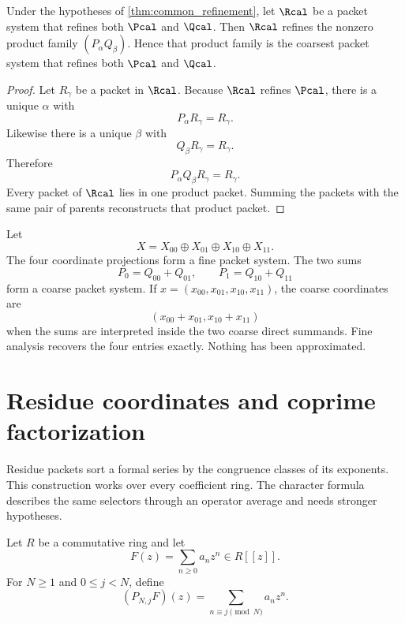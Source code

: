 \begin{proposition}\label{prop:coarsest_common_refinement}
Under the hypotheses of \cref{thm:common_refinement}, let $\Rcal$ be a packet system that refines both $\Pcal$ and $\Qcal$.  Then $\Rcal$ refines the nonzero product family $(P_\alpha Q_\beta)$.  Hence that product family is the coarsest packet system that refines both $\Pcal$ and $\Qcal$.
\end{proposition}

\begin{proof}
Let $R_\gamma$ be a packet in $\Rcal$.  Because $\Rcal$ refines $\Pcal$, there is a unique $\alpha$ with
\[
P_\alpha R_\gamma=R_\gamma.
\]
Likewise there is a unique $\beta$ with
\[
Q_\beta R_\gamma=R_\gamma.
\]
Therefore
\[
P_\alpha Q_\beta R_\gamma=R_\gamma.
\]
Every packet of $\Rcal$ lies in one product packet.  Summing the packets with the same pair of parents reconstructs that product packet.
\end{proof}

\begin{example}\label{ex:two_level_split}
Let
\[
X=X_{00}\oplus X_{01}\oplus X_{10}\oplus X_{11}.
\]
The four coordinate projections form a fine packet system.  The two sums
\[
P_0=Q_{00}+Q_{01},
\qquad
P_1=Q_{10}+Q_{11}
\]
form a coarse packet system.  If $x=(x_{00},x_{01},x_{10},x_{11})$, the coarse coordinates are
\[
(x_{00}+x_{01},x_{10}+x_{11})
\]
when the sums are interpreted inside the two coarse direct summands.  Fine analysis recovers the four entries exactly.  Nothing has been approximated.
\end{example}

\section{Residue coordinates and coprime factorization}\label{sec:residue}

Residue packets sort a formal series by the congruence classes of its exponents. This construction works over every coefficient ring. The character formula describes the same selectors through an operator average and needs stronger hypotheses.

\begin{definition}\label{def:residue_selector}
Let $R$ be a commutative ring and let
\[
F(z)=\sum_{n\geq0}a_nz^n\in R[[z]].
\]
For $N\geq1$ and $0\leq j<N$, define
\[
(P_{N,j}F)(z)
=
\sum_{n\equiv j\pmod N}a_nz^n.
\]
\end{definition}

